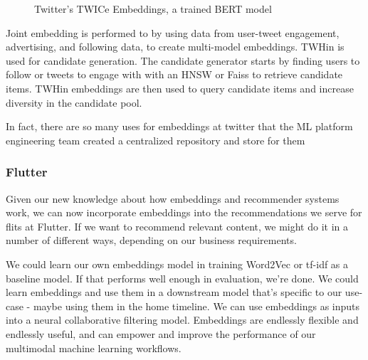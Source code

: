 \documentclass[11pt, table]{diazessay} %
\begin{document}
\begin{sloppypar}
\begin{figure}[H]
\caption{Twitter's TWICe Embeddings, a trained BERT model\citep{el2022twhin}}
\end{figure}

Joint embedding is performed to by using data from user-tweet engagement, advertising, and following data, to create multi-model embeddings. TWHin is used for candidate generation. The candidate generator starts by finding users to follow or tweets to engage with with an HNSW or Faiss to retrieve candidate items. TWHin embeddings are then used to query candidate items and increase diversity in the candidate pool. 

In fact, there are so many uses for embeddings at twitter that the ML platform engineering team created a centralized repository and store for them


\subsubsection{Flutter}

Given our new knowledge about how embeddings and recommender systems work, we can now incorporate embeddings into the recommendations we serve for flits at Flutter.  If we want to recommend relevant content, we might do it in a number of different ways, depending on our business requirements. 

We could learn our own embeddings model in training Word2Vec or tf-idf as a baseline model. If that performs well enough in evaluation, we're done. We could learn embeddings and use them in a downstream model that's specific to our use-case - maybe using them in the home timeline.  We can use embeddings as inputs into a neural collaborative filtering model\citep{he2017neural}.
Embeddings are endlessly flexible and endlessly useful, and can empower and improve the performance of our multimodal machine learning workflows. 


\end{sloppypar}
\end{document}
